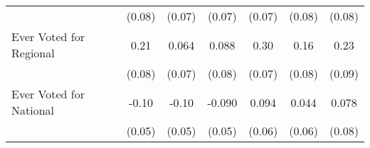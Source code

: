 {\begin{tabular}{l*{6}{c}}
            &      (0.08)         &      (0.07)         &      (0.07)         &      (0.07)         &      (0.08)         &      (0.08)         \\
\addlinespace
Ever Voted for Regional&        0.21\sym{**} &       0.064         &       0.088         &        0.30\sym{***}&        0.16\sym{*}  &        0.23\sym{**} \\
            &      (0.08)         &      (0.07)         &      (0.08)         &      (0.07)         &      (0.08)         &      (0.09)         \\
\addlinespace
Ever Voted for National&       -0.10\sym{*}  &       -0.10\sym{*}  &      -0.090         &       0.094         &       0.044         &       0.078         \\
            &      (0.05)         &      (0.05)         &      (0.05)         &      (0.06)         &      (0.06)         &      (0.08)         \\
\bottomrule
\end{tabular}
}
